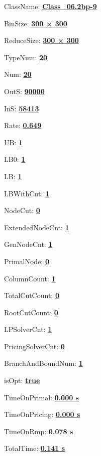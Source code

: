 \documentclass[11pt]{article}
\begin{document}
\pagestyle{empty}


ClassName: \underline{\textbf{Class_06.2bp-9}}
\par
BinSize: \underline{\textbf{300 × 300}}
\par
ReduceSize: \underline{\textbf{300 × 300}}
\par
TypeNum: \underline{\textbf{20}}
\par
Num: \underline{\textbf{20}}
\par
OutS: \underline{\textbf{90000}}
\par
InS: \underline{\textbf{58413}}
\par
Rate: \underline{\textbf{0.649}}
\par
UB: \underline{\textbf{1}}
\par
LB0: \underline{\textbf{1}}
\par
LB: \underline{\textbf{1}}
\par
LBWithCut: \underline{\textbf{1}}
\par
NodeCut: \underline{\textbf{0}}
\par
ExtendedNodeCnt: \underline{\textbf{1}}
\par
GenNodeCnt: \underline{\textbf{1}}
\par
PrimalNode: \underline{\textbf{0}}
\par
ColumnCount: \underline{\textbf{1}}
\par
TotalCutCount: \underline{\textbf{0}}
\par
RootCutCount: \underline{\textbf{0}}
\par
LPSolverCnt: \underline{\textbf{1}}
\par
PricingSolverCnt: \underline{\textbf{0}}
\par
BranchAndBoundNum: \underline{\textbf{1}}
\par
isOpt: \underline{\textbf{true}}
\par
TimeOnPrimal: \underline{\textbf{0.000 s}}
\par
TimeOnPricing: \underline{\textbf{0.000 s}}
\par
TimeOnRmp: \underline{\textbf{0.078 s}}
\par
TotalTime: \underline{\textbf{0.141 s}}
\par
\newpage
\end{document}
